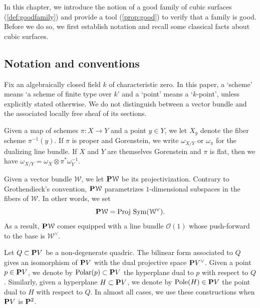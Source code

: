 \documentclass[12pt,reqno]{amsart}
\renewcommand{\k}{k}
\DeclareMathOperator{\Polar}{Polar}
\DeclareMathOperator{\Pole}{Pole}
\renewcommand{\to}{{\longrightarrow}}
\numberwithin{equation}{section}
\renewcommand{\O}{\mathcal O}
\newcommand{\Proj}{{\text{\rm Proj}\,}}
\begin{document}
In this chapter, we introduce the notion of a good family of cubic surfaces (\autoref{def:goodfamily}) and provide a tool (\autoref{prop:good}) to verify that a family is good.  Before we do so, we first establish notation and recall some classical facts about cubic surfaces.

\subsection{Notation and conventions}
\label{sec:notation-conventions}
Fix an algebraically closed field $\k$ of characteristic zero.  In
this paper, a `scheme' means `a scheme of finite type over $\k$' and a
`point' means a `$\k$-point', unless explicitly stated otherwise.  We
do not distinguish between a vector bundle and the associated locally
free sheaf of its sections.

Given a map of schemes $\pi \colon X \to Y$ and a point $y \in Y$, we
let $X_y$ denote the fiber scheme $\pi^{-1}(y)$.  If $\pi$ is proper
and Gorenstein, we write $\omega_{X/Y}$ or $\omega_\pi$ for the
dualizing line bundle.  If $X$ and $Y$ are themselves Gorenstein and
$\pi$ is flat, then we have
$\omega_{X/Y} = \omega_X \otimes \pi^*\omega_Y^{-1}$.

Given a vector bundle $\mathcal W$, we let $\P \mathcal W$ be its
projectivization.  Contrary to Grothendieck's convention,
$\P \mathcal W$ parametrizes $1$-dimensional subspaces in the fibers
of $\mathcal W$.  In other words, we set
\[ \P \mathcal W = \Proj \Sym(\mathcal W^\vee).\] As a result,
$\P \mathcal W$ comes equipped with a line bundle $\O(1)$ whose
push-forward to the base is $\mathcal W^\vee$.

Let $Q \subset \P V$ be a non-degenerate quadric.  The bilinear form
associated to $Q$ gives an isomorphism of $\P V$ with the dual
projective space $\P V^\vee$.  Given a point $p \in \P V$, we denote
by $\Polar(p) \subset \P V$ the hyperplane dual to $p$ with respect to
$Q$. Similarly, given a hyperplane $H \subset \P V$, we denote by
$\Pole(H) \in \P V$ the point dual to $H$ with respect to $Q$.  In
almost all cases, we use these constructions when $\P V$ is $\P^2$.
\end{document}
